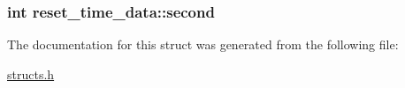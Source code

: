 \hypertarget{structreset__time__data_aae7671c11352b020ff22a146fc209c3b}{
\subsubsection[{second}]{\setlength{\rightskip}{0pt plus 5cm}int reset\-\_\-time\-\_\-data\-::second}}\label{structreset__time__data_aae7671c11352b020ff22a146fc209c3b}


The documentation for this struct was generated from the following file\-:\begin{DoxyCompactItemize}
\item 
\hyperlink{structs_8h}{structs.\-h}\end{DoxyCompactItemize}
